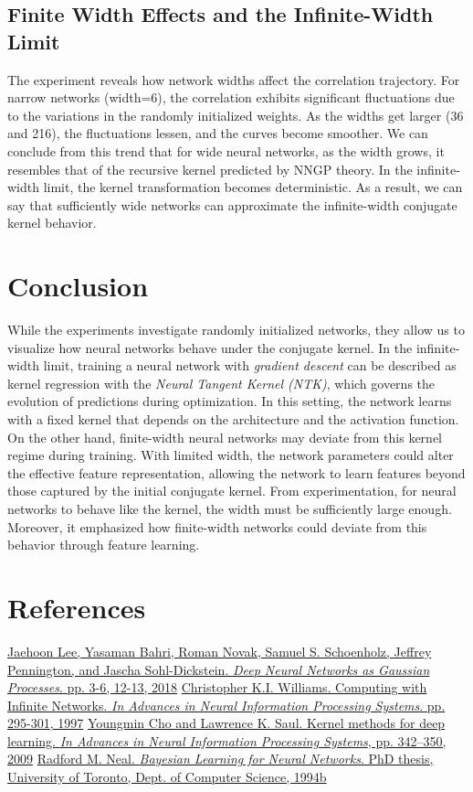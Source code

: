\documentclass{article}
\newcommand{\NL}{\newline 
\newline}
\begin{document}
\subsection{Finite Width Effects and the Infinite-Width Limit}
The experiment reveals how network widths affect the correlation trajectory. For narrow networks (width=6), the correlation exhibits significant fluctuations due to the variations in the randomly initialized weights. As the widths get larger (36 and 216), the fluctuations lessen, and the curves become smoother.
\NL
We can conclude from this trend that for wide neural networks, as the width grows, it resembles that of the recursive kernel predicted by NNGP theory. In the infinite-width limit, the kernel transformation becomes deterministic. As a result, we can say that sufficiently wide networks can approximate the infinite-width conjugate kernel behavior.
\section{Conclusion}
While the experiments investigate randomly initialized networks, they allow us to visualize how neural networks behave under the conjugate kernel. In the infinite-width limit, training a neural network with \textit{gradient descent} can be described as kernel regression with the \textit{Neural Tangent Kernel (NTK)}, which governs the evolution of predictions during optimization. In this setting, the network learns with a fixed kernel that depends on the architecture and the activation function.
\NL
On the other hand, finite-width neural networks may deviate from this kernel regime during training. With limited width, the network parameters could alter the effective feature representation, allowing the network to learn features beyond those captured by the initial conjugate kernel. From experimentation, for neural networks to behave like the kernel, the width must be sufficiently large enough. Moreover, it emphasized how finite-width networks could deviate from this behavior through feature learning.
\section{References}
\href{https://arxiv.org/abs/1711.00165}{Jaehoon Lee, Yasaman Bahri, Roman Novak, Samuel S. Schoenholz, Jeffrey Pennington, and Jascha Sohl-Dickstein. \textit{Deep Neural Networks as Gaussian Processes}. pp. 3-6, 12-13, 2018}
\NL
\href{https://papers.nips.cc/paper/1996/hash/ae5e3ce40e0404a45ecacaaf05e5f735-Abstract.html}{Christopher K.I. Williams. Computing with Infinite Networks. \textit{In Advances in Neural Information Processing Systems}. pp. 295-301, 1997}
\NL
\href{https://papers.nips.cc/paper/2009/hash/5751ec3e9a4feab575962e78e006250d-Abstract.html}{Youngmin Cho and Lawrence K. Saul. Kernel methods for deep learning. \textit{In Advances in Neural Information Processing Systems}, pp. 342–350, 2009}
\NL
\href{https://glizen.com/radfordneal/bnn.book.html}{Radford M. Neal. \textit{Bayesian Learning for Neural Networks}. PhD thesis, University of Toronto, Dept. of Computer Science, 1994b}
\end{document}
